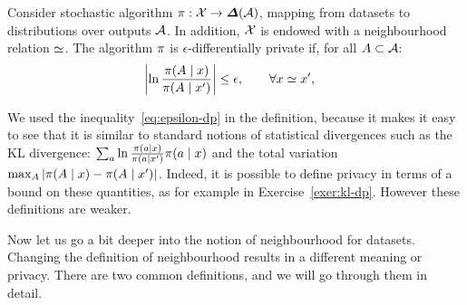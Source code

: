 \begin{frame}
    \begin{definition}
      \label{def:epsilon-dp}
      Consider stochastic algorithm $\pol : \CX \to \Simplex(\CA)$, mapping from datasets to distributions over outputs ${\mathcal{A}}$. In addition, ${\mathcal{X}}$ is endowed with a neighbourhood relation $\simeq$. The algorithm $\pi$ is  $\epsilon$-differentially private if, for all $A \subset {\mathcal{A}}$:
      \begin{equation}
        \label{eq:epsilon-dp}
        \left|\ln \frac{\pi(A \mid x)}{\pi(A \mid x')}\right| \leq \epsilon , \qquad \forall x \simeq x', \quad 
      \end{equation}
    \end{definition}
    
  We used the inequality~\eqref{eq:epsilon-dp} in the definition,
  because it makes it easy to see that it is similar to standard
  notions of statistical divergences such as the KL divergence:
  $\sum_a \ln \frac{\pi(a \mid x)}{\pi(a \mid x')} \pi(a \mid x)$
  and the total variation $\max_A |\pi(A \mid x) - \pi(A \mid
  x')|$. Indeed, it is possible to define privacy in terms of a bound
  on these quantities, as for example in
  Exercise~\ref{exer:kl-dp}. However these definitions are weaker.


  Now let us go a bit deeper into the notion of neighbourhood for datasets. Changing the definition of neighbourhood results in a different meaning 
or privacy. There are two common definitions, and we will go through them in detail.
\end{frame}

